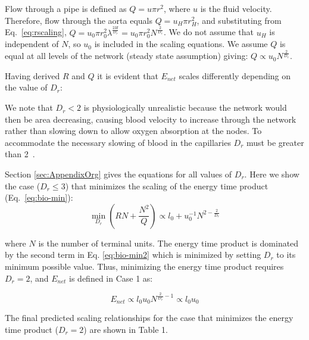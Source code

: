 \documentclass[12pt]{article}
\begin{document}
Flow through a pipe is defined as $Q = u\pi r^2$, where $u$ is the fluid
velocity. 
Therefore, flow through the aorta equals $Q = u_H \pi r_{H}^2$, and
substituting from Eq.~\ref{eq:rscaling}, $Q = u_0 \pi r_0^2
\lambda^{\frac{2H}{D_r}} = u_0 \pi r_0^2N^{\frac{2}{D_r}} $.  We do not assume
that $u_H$ is independent of $N$, so $u_0$ is included in the scaling
equations.  We assume $Q$ is equal at all levels of the network (steady state
assumption) giving: $Q \propto u_0 N^{\frac{2}{D_r}}$. 

Having derived $R$ and $Q$ it is evident that $E_{net}$ scales differently
depending on the value of $D_r$:

\begin{caseof}

\end{caseof}
\noindent We note that $D_r < 2$ is physiologically unrealistic because the network would
then be area decreasing, causing blood velocity to increase through the network
rather than slowing down to allow oxygen absorption at the nodes. To
accommodate the necessary slowing of blood in the capillaries $D_r$ must be
greater than 2~\cite{west97}.

Section \ref{sec:AppendixOrg} gives the equations
for all values of $D_r$. Here we show the case ($D_r \leq 3$) that minimizes
the scaling of the energy time product (Eq.~\ref{eq:bio-min}):
\begin{equation}
  \min_{D_r} (RN + \frac{N^2}{Q})
  \propto l_0 + u_0^{-1}N^{2-\frac{2}{D_r}}
\label{eq:bio-min2}
\end{equation}

\noindent where $N$ is the number of terminal units.  The energy time product is dominated by the second term in Eq.
\ref{eq:bio-min2} which is minimized by setting $D_r$ to its minimum possible
value. Thus, minimizing the energy time product requires $D_r = 2$, and 
 $E_{net}$ is defined in Case 1 as: 

\begin{equation}
E_{net} \propto l_0 u_0 N^{\frac{2}{D_r}-1} \propto l_0 u_0
\label{eq:EnetOrg}
\end{equation}


\noindent The final predicted scaling relationships for the case that minimizes the energy time product ($D_r = 2$) are shown in Table 1.
\end{document}
